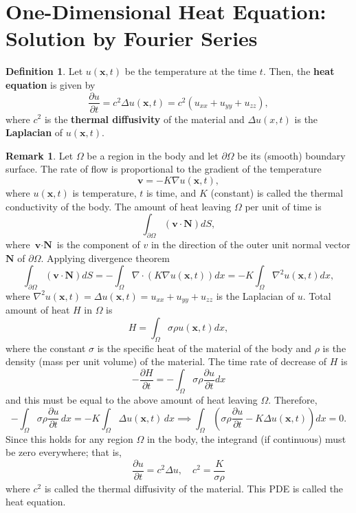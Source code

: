 \documentclass[12pt,openany]{book}
\theoremstyle{definition}
\newtheorem{definition}{Definition}[chapter]
\newtheorem{remark}{Remark}[chapter]
\begin{document}
	\newpage
	\section{One-Dimensional Heat Equation: Solution by Fourier Series}
	\begin{tcolorbox}[colframe=defcolor, title={\color{white}\bf Heat Equation}]
		\begin{definition}
			Let \( u(\textbf{x}, t) \) be the temperature at the time \( t \). Then, the \textbf{heat equation} is given by
			\[
			\frac{\partial u}{\partial t} = c^2 \Delta u(\textbf{x}, t) = c^2 (u_{xx} + u_{yy} + u_{zz}),
			\]
			where \( c^2 \) is the \textbf{thermal diffusivity} of the material and \( \Delta u(x, t) \) is the \textbf{Laplacian} of \( u(\textbf{x}, t) \).
		\end{definition}
	\end{tcolorbox}
	\begin{remark}
		Let \(\Omega\) be a region in the body and let \(\partial \Omega\) be its (smooth) boundary surface.
		The rate of flow is proportional to the gradient of the temperature
		\[
		\textbf{v} = -K\nabla u(\textbf{x}, t),
		\] where \( u(\textbf{x}, t) \) is temperature, \( t \) is time, and \( K \) (constant) is called the thermal conductivity of the body. The amount of heat leaving \(\Omega\) per unit of time is
		\[
		\int_{\partial \Omega} (\textbf{v} \cdot \textbf{N}) dS,
		\]
		where \( \textbf{v} \cdot \textbf{N} \) is the component of \( v \) in the direction of the outer unit normal vector \( \textbf{N} \) of \(\partial \Omega\). Applying divergence theorem
		\[
		\int_{\partial \Omega} (\textbf{v} \cdot \textbf{N}) dS = - \int_{\Omega} \nabla \cdot (K\nabla u(\textbf{x}, t)) dx = -K \int_{\Omega} \nabla^2 u(\textbf{x}, t) dx,
		\]
		where \( \nabla^2 u(\textbf{x}, t) = \Delta u(\textbf{x}, t) = u_{xx} + u_{yy} + u_{zz} \) is the Laplacian of \( u \). Total amount of heat \( H \) in \(\Omega\) is
		\[
		H = \int_{\Omega} \sigma \rho u(\textbf{x}, t) dx,
		\]
		where the constant \( \sigma \) is the specific heat of the material of the body and \( \rho \) is the density (mass per unit volume) of the material. The time rate of decrease of \( H \) is
		\[
		-\frac{\partial H}{\partial t} = - \int_{\Omega} \sigma \rho \frac{\partial u}{\partial t} dx
		\]
		and this must be equal to the above amount of heat leaving \(\Omega\). Therefore,
		\[
		- \int_{\Omega} \sigma \rho \frac{\partial u}{\partial t} \, dx = -K \int_{\Omega} \Delta u(\textbf{x}, t) \, dx\implies
		\int_{\Omega} \left( \sigma \rho \frac{\partial u}{\partial t} - K \Delta u(\textbf{x}, t) \right) dx = 0.
		\] Since this holds for any region \(\Omega\) in the body, the integrand (if continuous) must be zero everywhere; that is,
		\[
		\frac{\partial u}{\partial t} = c^2 \Delta u, \quad c^2 = \frac{K}{\sigma \rho}
		\]
		where \(c^2\) is called the thermal diffusivity of the material. This PDE is called the heat equation.
	\end{remark}
\end{document}
